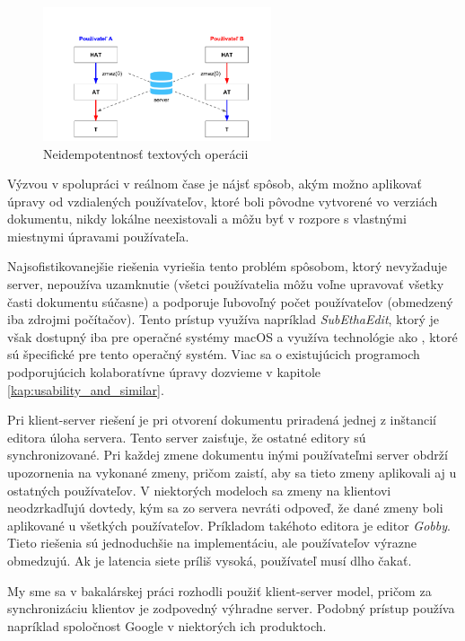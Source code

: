 \begin{figure}[H]
\centerline{\includegraphics[width=0.6\textwidth]{images/neidempotentne_operacie}}
\caption[Neidempotentnosť textových operácii]{Neidempotentnosť textových operácii}
\label{obr:neidempotentnost}
\end{figure}

Výzvou v spolupráci v reálnom čase je nájsť spôsob, akým možno aplikovať úpravy od vzdialených
používateľov, ktoré boli pôvodne vytvorené vo verziách dokumentu, nikdy lokálne neexistovali a môžu
byť v rozpore s vlastnými miestnymi úpravami používateľa. 

Najsofistikovanejšie riešenia vyriešia tento problém spôsobom, ktorý nevyžaduje server, nepoužíva
uzamknutie (všetci používatelia môžu voľne upravovať všetky časti dokumentu súčasne) a podporuje
ľubovoľný počet používateľov (obmedzený iba zdrojmi počítačov). Tento prístup využíva napríklad
\textit{SubEthaEdit}, ktorý je však dostupný iba pre operačné systémy macOS a využíva
technológie ako \cite{bonjour}, ktoré sú špecifické pre tento operačný systém. Viac sa o
existujúcich programoch podporujúcich kolaboratívne úpravy dozvieme v kapitole
\ref{kap:usability_and_similar}.

Pri klient-server riešení je pri otvorení dokumentu priradená jednej z inštancií editora
úloha servera. Tento server zaisťuje, že ostatné editory sú synchronizované. Pri každej zmene
dokumentu inými používateľmi server obdrží upozornenia na vykonané zmeny, pričom zaistí, aby
sa tieto zmeny aplikovali aj u ostatných používateľov. 
V niektorých modeloch sa zmeny na klientovi neodzrkadľujú dovtedy,
kým sa zo servera nevráti odpoveď, že dané zmeny boli aplikované u všetkých používateľov.
Príkladom takéhoto editora je editor \textit{Gobby}. Tieto riešenia sú 
jednoduchšie na implementáciu, ale používateľov výrazne obmedzujú. Ak je latencia siete
príliš vysoká, používateľ musí dlho čakať.

My sme sa v bakalárskej práci rozhodli použiť klient-server model, pričom za synchronizáciu klientov
je zodpovedný výhradne server. Podobný prístup používa napríklad spoločnost Google v 
niektorých ich produktoch.

